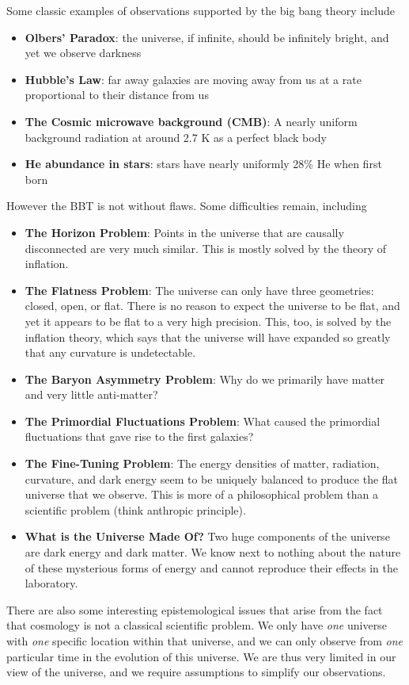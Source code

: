\documentclass[10pt]{article}
\numberwithin{equation}{section}
\begin{document}
	Some classic examples of observations supported by the big bang theory include
	\begin{itemize}
		\item \textbf{Olbers' Paradox}: the universe, if infinite, should be infinitely bright, and yet we observe darkness
		\item \textbf{Hubble's Law}: far away galaxies are moving away from us at a rate proportional to their distance from us
		\item \textbf{The Cosmic microwave background (CMB)}: A nearly uniform background radiation at around 2.7 K as a perfect black body
		\item \textbf{He abundance in stars}: stars have nearly uniformly 28\% He when first born
	\end{itemize}
	However the BBT is not without flaws. Some difficulties remain, including
	\begin{itemize}
		\item \textbf{The Horizon Problem}: Points in the universe that are causally disconnected are very much similar. This is mostly solved by the theory of inflation.
		\item \textbf{The Flatness Problem}: The universe can only have three geometries: closed, open, or flat. There is no reason to expect the universe to be flat, and yet it appears to be flat to a very high precision. This, too, is solved by the inflation theory, which says that the universe will have expanded so greatly that any curvature is undetectable.
		\item \textbf{The Baryon Asymmetry Problem}: Why do we primarily have matter and very little anti-matter?
		\item \textbf{The Primordial Fluctuations Problem}: What caused the primordial fluctuations that gave rise to the first galaxies?
		\item \textbf{The Fine-Tuning Problem}: The energy densities of matter, radiation, curvature, and dark energy seem to be uniquely balanced to produce the flat universe that we observe. This is more of a philosophical problem than a scientific problem (think anthropic principle).
		\item \textbf{What is the Universe Made Of?} Two huge components of the universe are dark energy and dark matter. We know next to nothing about the nature of these mysterious forms of energy and cannot reproduce their effects in the laboratory.
	\end{itemize}
	There are also some interesting epistemological issues that arise from the fact that cosmology is not a classical scientific problem. We only have \emph{one} universe with \emph{one} specific location within that universe, and we can only observe from \emph{one} particular time in the evolution of this universe. We are thus very limited in our view of the universe, and we require assumptions to simplify our observations.\\
	
\end{document}
